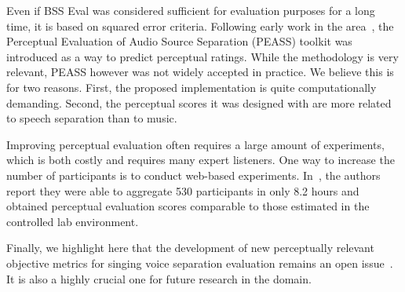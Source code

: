 Even if BSS Eval was considered sufficient for evaluation purposes for a long time, it is based on squared error criteria. Following early work in the area~\cite{kornycky08}, the Perceptual Evaluation of Audio Source Separation (PEASS) toolkit \cite{emiya10,emiya11,vincent122} was introduced as a way to predict perceptual ratings. While the methodology is very relevant, PEASS however was not widely accepted in practice. We believe this is for two reasons. First, the proposed implementation is quite computationally demanding. Second, the perceptual scores it was designed with are more related to speech separation than to music.

Improving perceptual evaluation often requires a large amount of experiments, which is both costly and requires many expert listeners. One way to increase the number of participants is to conduct web-based experiments. In~\cite{cartwright16}, the authors report they were able to aggregate 530 participants in only 8.2 hours and obtained perceptual evaluation scores comparable to those estimated in the controlled lab environment.

Finally, we highlight here that the development of new perceptually relevant objective metrics for singing voice separation evaluation remains an open issue~\cite{gupta15}. It is also a highly crucial one for future research in the domain.
